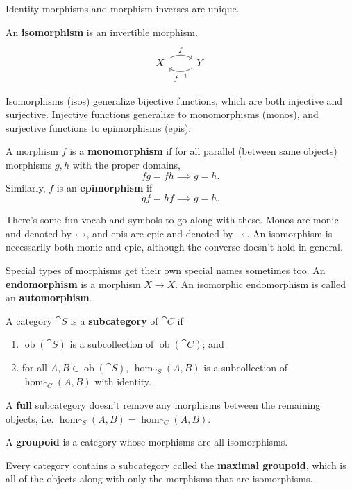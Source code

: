 \documentclass[twoside,10pt]{report}
\DeclareMathOperator{\ob}{ob}
\begin{document}
\begin{prop}
Identity morphisms and morphism inverses are unique.
\end{prop}

\begin{defn}[]
An \textbf{isomorphism} is an invertible morphism.
\[
\begin{tikzcd}
	X \rar[bend left]{f} & Y \lar[bend left]{f^{-1}}
\end{tikzcd}
\] 
\end{defn}
Isomorphisms (isos) generalize bijective functions, which are both injective and surjective. Injective functions generalize to monomorphisms (monos), and surjective functions to epimorphisms (epis).
\begin{defn}[]
	A morphism $f$ is a \textbf{monomorphism} if for all parallel (between same objects) morphisms $g,h$ with the proper domains,
	\[
	fg = fh \implies g=h.
	\] Similarly, $f$ is an \textbf{epimorphism} if
	\[
	gf = hf \implies g=h.
	\] 
\end{defn}
There's some fun vocab and symbols to go along with these. Monos are monic and denoted by $\rightarrowtail$, and epis are epic and denoted by $\twoheadrightarrow$. An isomorphism is necessarily both monic and epic, although the converse doesn't hold in general.

Special types of morphisms get their own special names sometimes too. An \textbf{endomorphism} is a morphism $X\to X$. An isomorphic endomorphism is called an \textbf{automorphism}.
\begin{defn}
	A category $\cat{S}$ is a \textbf{subcategory} of $\cat{C}$ if
	\begin{enumerate}
		\item $\ob(\cat{S})$ is a subcollection of $\ob(\cat{C})$; and
		\item for all $A, B \in \ob(\cat{S})$, $\hom_{\cat{S}}(A,B)$ is a subcollection of $\hom_{\cat{C}}(A,B)$ with identity.
	\end{enumerate}
\end{defn}
A \textbf{full} subcategory doesn't remove any morphisms between the remaining objects, i.e. $\hom_{\cat{S} }(A,B) = \hom_{\cat{C} }(A,B)$.

\begin{defn}[]
A \textbf{groupoid} is a category whose morphisms are all isomorphisms.
\end{defn}
Every category contains a subcategory called the \textbf{maximal groupoid}, which is all of the objects along with only the morphisms that are isomorphisms.
\end{document}
